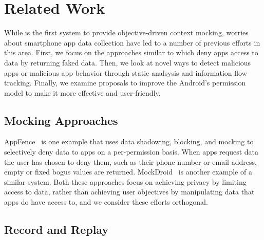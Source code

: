 \section{Related Work}
\label{sec-related}

While \PocketMocker{} is the first system to provide objective-driven context
mocking, worries about smartphone app data collection have led to a number of
previous efforts in this area. First, we focus on the  approaches similar to
\PocketMocker{} which deny apps access to data by returning faked data. Then,
we look at novel ways to detect malicious apps or malicious app behavior
through static analsysis and information flow tracking. Finally, we examine
proposals to improve the Android's permission model to make it more effective
and user-friendly.



\subsection{Mocking Approaches}

AppFence~\cite{droids-ccs11} is one example that uses data shadowing,
blocking, and mocking to selectively deny data to apps on a per-permission
basis. When apps request data the user has chosen to deny them, such as their
phone number or email address, empty or fixed bogus values are returned.
MockDroid~\cite{mockdroid-hotmobile11} is another example of a similar
system. Both these approaches focus on achieving privacy by limiting access
to data, rather than achieving user objectives by manipulating data that apps
do have access to, and we consider these efforts orthogonal.


\subsection{Record and Replay}

